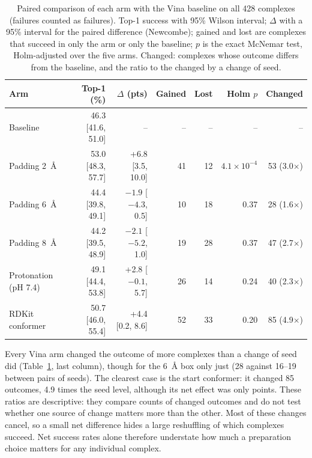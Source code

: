 \begin{table}[h]
  \centering
  \caption{Paired comparison of each arm with the Vina baseline on all 428 complexes
    (failures counted as failures). Top-1 success with 95\% Wilson interval; $\Delta$ with
    a 95\% interval for the paired difference (Newcombe); gained and lost
    are complexes that succeed in only the arm or only the baseline; $p$ is the exact
    McNemar test, Holm-adjusted over the five arms. Changed: complexes whose outcome
    differs from the baseline, and the ratio to the  changed by a change of seed.}
  \label{tab:comparisons}
  \small
  \setlength{\tabcolsep}{4pt}
  \begin{tabular}{lrrrrrr}
    \toprule
    Arm & Top-1 (\%) & $\Delta$ (pts) & Gained & Lost & Holm $p$ & Changed \\
    \midrule
    Baseline & 46.3 [41.6, 51.0] & -- & -- & -- & -- & -- \\
    Padding \SI{2}{\angstrom} & 53.0 [48.3, 57.7] & +6.8 [3.5, 10.0] & 41 & 12 & $4.1\times10^{-4}$
      & 53 (3.0$\times$) \\
    Padding \SI{6}{\angstrom} & 44.4 [39.8, 49.1] & $-1.9$ [$-4.3$, 0.5] & 10 & 18 & 0.37 & 28 (1.6$\times$) \\
    Padding \SI{8}{\angstrom} & 44.2 [39.5, 48.9] & $-2.1$ [$-5.2$, 1.0] & 19 & 28 & 0.37 & 47 (2.7$\times$) \\
    Protonation (pH 7.4) & 49.1 [44.4, 53.8] & +2.8 [$-0.1$, 5.7] & 26 & 14 & 0.24 & 40 (2.3$\times$) \\
    RDKit conformer & 50.7 [46.0, 55.4] & +4.4 [0.2, 8.6] & 52 & 33 & 0.20 & 85 (4.9$\times$) \\
    \bottomrule
  \end{tabular}
\end{table}

Every Vina arm changed the outcome of more complexes than a change of seed did
(Table~\ref{tab:comparisons}, last column), though for the \SI{6}{\angstrom} box only just
(28 against 16--19 between pairs of seeds). The clearest case is the start conformer: it
changed 85 outcomes, 4.9 times the seed level, although its net effect was only 
points. These ratios are descriptive: they compare counts of changed outcomes and do not
test whether one source of change matters more than the other. Most of these changes cancel, so a small net difference hides a large reshuffling of
which complexes succeed. Net success rates alone therefore understate how much a preparation
choice matters for any individual complex.

